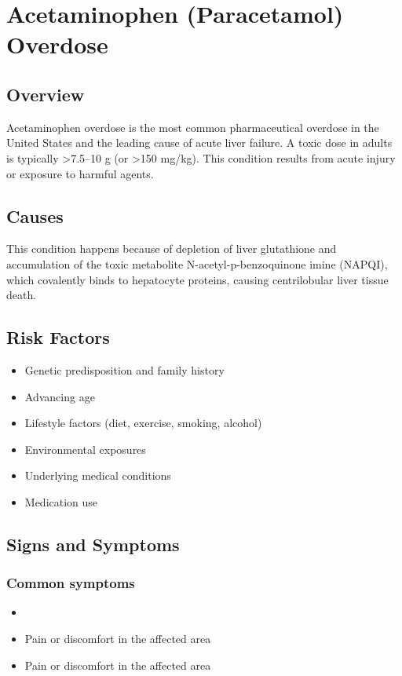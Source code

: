 \chapter{Acetaminophen (Paracetamol) Overdose}
\label{sec:Acetaminophen Overdose}

\section{Overview}
Acetaminophen overdose is the most common pharmaceutical overdose in the United States and the leading cause of acute liver failure. A toxic dose in adults is typically >7.5--10 g (or >150 mg/kg). This condition results from acute injury or exposure to harmful agents.
\section{Causes}
This condition happens because of depletion of liver glutathione and accumulation of the toxic metabolite N-acetyl-p-benzoquinone imine (NAPQI), which covalently binds to hepatocyte proteins, causing centrilobular liver tissue death.     
\section{Risk Factors}

\begin{itemize}[noitemsep]
  \item Genetic predisposition and family history
  \item Advancing age
  \item Lifestyle factors (diet, exercise, smoking, alcohol)
  \item Environmental exposures
  \item Underlying medical conditions
  \item Medication use
\end{itemize}
\section{Signs and Symptoms}

\subsection{Common symptoms}
\begin{itemize}[noitemsep]
  \item \item Pain or discomfort in the affected area    \item Pain or discomfort in the affected area
  \end{itemize}


